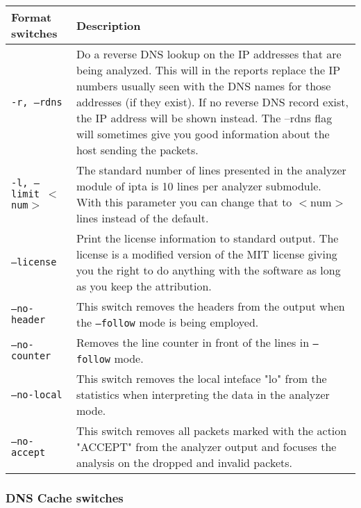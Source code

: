 \documentclass[english,twoside,openright,a4paper,12pt]{article}
\begin{document}
\scriptsize
\begin{longtable}{|p{}|p{}|}
\hline
\textbf{Format switches} & \textbf{Description}\\ \hline

\texttt{-r, --rdns} & 

Do a reverse DNS lookup on the IP addresses that are being analyzed.
This will in the reports replace the IP numbers usually seen with the
DNS names for those addresses (if they exist). If no reverse DNS
record exist, the IP address will be shown instead. The --rdns flag
will sometimes give you good information about the host sending the
packets.\\\hline

\texttt{-l, --limit $<$num$>$} & 

The standard number of lines presented in the analyzer module of ipta
is 10 lines per analyzer submodule. With this parameter you can change
that to $<$num$>$ lines instead of the default.\\\hline

\texttt{--license} & 

Print the license information to standard output. The license is a
modified version of the MIT license giving you the right to do
anything with the software as long as you keep the
attribution.\\ \hline

\texttt{--no-header} & 

This switch removes the headers from the output when the
\texttt{--follow} mode is being employed.\\\hline

\texttt{--no-counter} & 

Removes the line counter in front of the lines in \texttt{--follow}
mode.\\\hline

\texttt{--no-local} & 

This switch removes the local inteface "lo" from the statistics when
interpreting the data in the analyzer mode.\\\hline

\texttt{--no-accept} & 

This switch removes all packets marked with the action "ACCEPT" from
the analyzer output and focuses the analysis on the dropped and
invalid packets.\\\hline
\end{longtable}

\subsubsection{DNS Cache switches}
\end{document}
